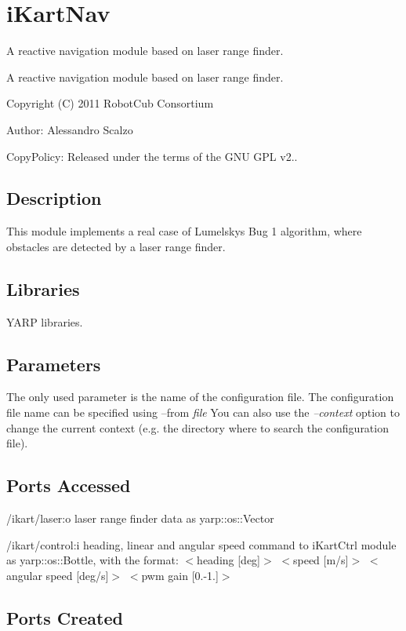 \section{i\+Kart\+Nav}
\label{group__iKartNav}


A reactive navigation module based on laser range finder.  


A reactive navigation module based on laser range finder. 

Copyright (C) 2011 Robot\+Cub Consortium

Author\+: Alessandro Scalzo

Copy\+Policy\+: Released under the terms of the G\+N\+U G\+P\+L v2..\hypertarget{group__laserScannerGui_intro_sec}{}\subsection{Description}\label{group__laserScannerGui_intro_sec}
This module implements a real case of Lumelsky\textquotesingle{}s Bug 1 algorithm, where obstacles are detected by a laser range finder.\hypertarget{group__laserScannerGui_lib_sec}{}\subsection{Libraries}\label{group__laserScannerGui_lib_sec}

\begin{DoxyItemize}
\item Y\+A\+R\+P libraries.
\end{DoxyItemize}\hypertarget{group__laserScannerGui_parameters_sec}{}\subsection{Parameters}\label{group__laserScannerGui_parameters_sec}
The only used parameter is the name of the configuration file. The configuration file name can be specified using --from {\itshape file} You can also use the {\itshape --context} option to change the current context (e.\+g. the directory where to search the configuration file).\hypertarget{group__laserScannerGui_portsa_sec}{}\subsection{Ports Accessed}\label{group__laserScannerGui_portsa_sec}

\begin{DoxyItemize}
\item /ikart/laser\+:o laser range finder data as yarp\+::os\+::\+Vector
\item /ikart/control\+:i heading, linear and angular speed command to i\+Kart\+Ctrl module as yarp\+::os\+::\+Bottle, with the format\+: $<$heading \mbox{[}deg\mbox{]}$>$ $<$speed \mbox{[}m/s\mbox{]}$>$ $<$angular speed \mbox{[}deg/s\mbox{]}$>$ $<$pwm gain \mbox{[}0.-\/1.\mbox{]}$>$
\end{DoxyItemize}\hypertarget{group__laserScannerGui_portsc_sec}{}\subsection{Ports Created}\label{group__laserScannerGui_portsc_sec}

